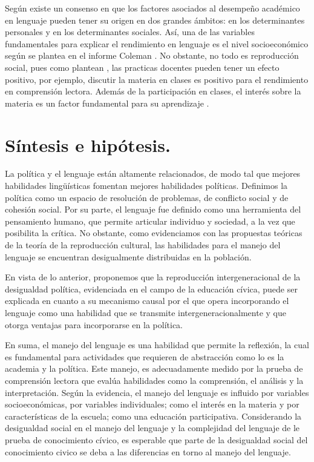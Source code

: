 \documentclass[12pt,twoside]{templates/facsothesis}
\begin{document}
Según \citet{barahonau_Factores_2014} existe un consenso en que los factores asociados al desempeño académico en lenguaje pueden tener su origen en dos grandes ámbitos: en los determinantes personales y en los determinantes sociales. Así, una de las variables fundamentales para explicar el rendimiento en lenguaje es el nivel socioeconómico según se plantea en el informe Coleman \citep{marques_Apuntes_2016}. No obstante, no todo es reproducción social, pues como plantean \citet{lara_mirada_2010}, las practicas docentes pueden tener un efecto positivo, por ejemplo, discutir la materia en clases es positivo para el rendimiento en comprensión lectora. Además de la participación en clases, el interés sobre la materia es un factor fundamental para su aprendizaje \citep{lozano_Relacion_2000}.

\hypertarget{suxedntesis-e-hipuxf3tesis.}{%
\section{Síntesis e hipótesis.}\label{suxedntesis-e-hipuxf3tesis.}}

La política y el lenguaje están altamente relacionados, de modo tal que mejores habilidades lingüísticas fomentan mejores habilidades políticas. Definimos la política como un espacio de resolución de problemas, de conflicto social y de cohesión social. Por su parte, el lenguaje fue definido como una herramienta del pensamiento humano, que permite articular individuo y sociedad, a la vez que posibilita la crítica. No obstante, como evidenciamos con las propuestas teóricas de la teoría de la reproducción cultural, las habilidades para el manejo del lenguaje se encuentran desigualmente distribuidas en la población.

En vista de lo anterior, proponemos que la reproducción intergeneracional de la desigualdad política, evidenciada en el campo de la educación cívica, puede ser explicada en cuanto a su mecanismo causal por el que opera incorporando el lenguaje como una habilidad que se transmite intergeneracionalmente y que otorga ventajas para incorporarse en la política.

En suma, el manejo del lenguaje es una habilidad que permite la reflexión, la cual es fundamental para actividades que requieren de abstracción como lo es la academia y la política. Este manejo, es adecuadamente medido por la prueba de comprensión lectora que evalúa habilidades como la comprensión, el análisis y la interpretación. Según la evidencia, el manejo del lenguaje es influido por variables socioeconómicas, por variables individuales; como el interés en la materia y por características de la escuela; como una educación participativa. Considerando la desigualdad social en el manejo del lenguaje y la complejidad del lenguaje de le prueba de conocimiento cívico, es esperable que parte de la desigualdad social del conocimiento civico se deba a las diferencias en torno al manejo del lenguaje.
\end{document}
